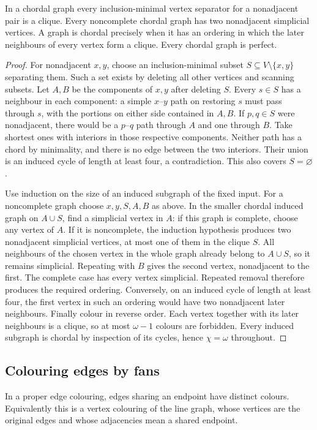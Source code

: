 \begin{theorem}\leavevmode\label{co:chordal}
In a chordal graph every inclusion-minimal vertex separator for a
nonadjacent pair is a clique. Every noncomplete chordal graph has two
nonadjacent simplicial vertices. A graph is chordal precisely when it has
an ordering in which the later neighbours of every vertex form a clique.
Every chordal graph is perfect.
\end{theorem}
\begin{proof}
For nonadjacent $x,y$, choose an inclusion-minimal subset
$S\subseteq V\setminus\{x,y\}$ separating them. Such a set exists by
deleting all other vertices and scanning subsets. Let $A,B$ be the
components of $x,y$ after deleting $S$. Every $s\in S$ has a neighbour
in each component: a simple $x$--$y$ path on restoring $s$ must pass
through $s$, with the portions on either side contained in $A,B$. If
$p,q\in S$ were nonadjacent, there would be a $p$--$q$ path through $A$
and one through $B$. Take shortest ones with interiors in those respective
components. Neither path has a chord by minimality, and there is no edge
between the two interiors. Their union is an induced cycle of length at
least four, a contradiction. This also covers $S=\varnothing$.

Use induction on the size of an induced subgraph of the fixed input.
For a noncomplete graph choose $x,y,S,A,B$ as above. In the smaller
chordal induced graph on $A\cup S$, find a simplicial vertex in $A$:
if this graph is complete, choose any vertex of $A$. If it is noncomplete,
the induction hypothesis produces two nonadjacent simplicial vertices,
at most one of them in the clique $S$. All neighbours of the chosen
vertex in the whole graph already belong to $A\cup S$, so it remains
simplicial. Repeating with $B$ gives the second vertex, nonadjacent to
the first. The complete case has every vertex simplicial.
Repeated removal therefore produces the required ordering. Conversely, on
an induced cycle of length at least four, the first vertex in such an
ordering would have two nonadjacent later neighbours. Finally colour in
reverse order. Each vertex together with its later neighbours is a clique,
so at most $\omega-1$ colours are forbidden. Every induced subgraph is
chordal by inspection of its cycles, hence $\chi=\omega$ throughout.
\end{proof}

\subsection{Colouring edges by fans}
In a proper edge colouring, edges sharing an endpoint have distinct colours.
Equivalently this is a vertex colouring of the line graph, whose vertices
are the original edges and whose adjacencies mean a shared endpoint.

